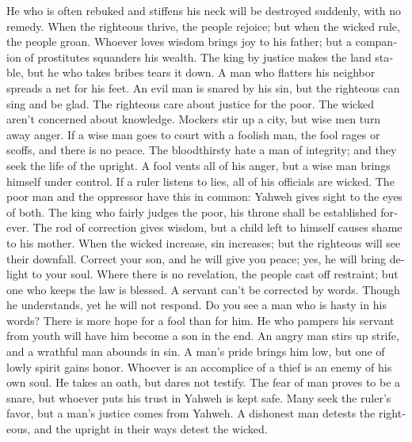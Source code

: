 \begin{paracol}{2}
\begin{otherlanguage}{english}
 He who is often rebuked and stiffens his neck will be
destroyed suddenly, with no remedy.  When the righteous
thrive, the people rejoice; but when the wicked rule, the people groan.
 Whoever loves wisdom brings joy to his father; but a
companion of prostitutes squanders his wealth.  The king
by justice makes the land stable, but he who takes bribes tears it down.
 A man who flatters his neighbor spreads a net for his
feet.  An evil man is snared by his sin, but the righteous
can sing and be glad.  The righteous care about justice
for the poor. The wicked aren't concerned about knowledge.
 Mockers stir up a city, but wise men turn away anger.
 If a wise man goes to court with a foolish man, the fool
rages or scoffs, and there is no peace.  The bloodthirsty
hate a man of integrity; and they seek the life of the upright.
 A fool vents all of his anger, but a wise man brings
himself under control.  If a ruler listens to lies, all
of his officials are wicked.  The poor man and the
oppressor have this in common: Yahweh gives sight to the eyes of both.
 The king who fairly judges the poor, his throne shall be
established forever.  The rod of correction gives wisdom,
but a child left to himself causes shame to his mother. 
When the wicked increase, sin increases; but the righteous will see
their downfall.  Correct your son, and he will give you
peace; yes, he will bring delight to your soul.  Where
there is no revelation, the people cast off restraint; but one who keeps
the law is blessed.  A servant can't be corrected by
words. Though he understands, yet he will not respond. 
Do you see a man who is hasty in his words? There is more hope for a
fool than for him.  He who pampers his servant from youth
will have him become a son in the end.  An angry man
stirs up strife, and a wrathful man abounds in sin.  A
man's pride brings him low, but one of lowly spirit gains honor.
 Whoever is an accomplice of a thief is an enemy of his
own soul. He takes an oath, but dares not testify.  The
fear of man proves to be a snare, but whoever puts his trust in Yahweh
is kept safe.  Many seek the ruler's favor, but a man's
justice comes from Yahweh.  A dishonest man detests the
righteous, and the upright in their ways detest the wicked.


\end{otherlanguage}
\end{paracol}
